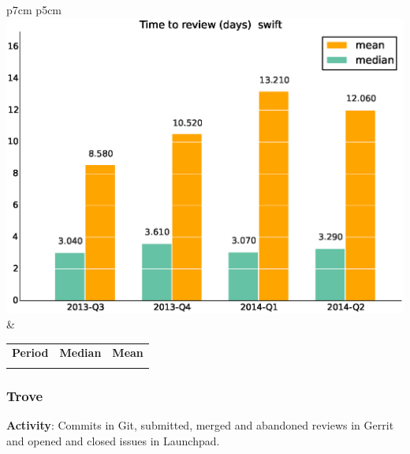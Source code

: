\documentclass[a4wide,11pt]{report}
\begin{document}
\begin{tabular}{p{7cm} p{5cm}}
    \vspace{0pt} 
    \includegraphics[scale=.35]{figs/timetoreview_medianswift.eps}
    & 
    \vspace{0pt}
    \begin{tabular}{l|r|r|}%
    \bfseries Period & \bfseries Median & \bfseries Mean %
    \csvreader[head to column names]{data/timetoreview_medianswift.csv}{}%
    {\\ & \mediantime & \meantime}
    \end{tabular}
\end{tabular}

\newpage 
 \subsubsection{Trove}

\textbf{Activity}: Commits in Git, submitted, merged and abandoned reviews in Gerrit and opened and closed issues in Launchpad.
\end{document}

